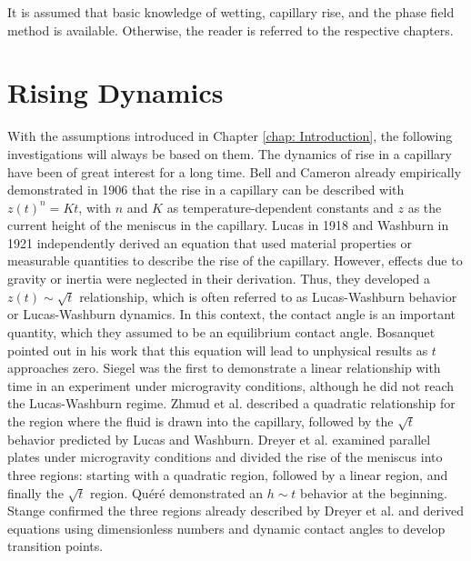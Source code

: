 It is assumed that basic knowledge of wetting, capillary rise, and the phase field method is available. Otherwise, the reader is referred to the respective chapters.

\section{Rising Dynamics}

With the assumptions introduced in Chapter \ref{chap: Introduction}, the following investigations will always be based on them. The dynamics of rise in a capillary have been of great interest for a long time. Bell and Cameron already empirically demonstrated in 1906 \cite{bell1906FlowLiquidsCapillary} that the rise in a capillary can be described with \(z(t)^n = Kt\), with \(n\) and \(K\) as temperature-dependent constants and \(z\) as the current height of the meniscus in the capillary. Lucas \cite{lucas1918UeberZeitgesetzKapillaren} in 1918 and Washburn \cite{washburn1921DynamicsCapillaryFlow} in 1921 independently derived an equation that used material properties or measurable quantities to describe the rise of the capillary. However, effects due to gravity or inertia were neglected in their derivation. Thus, they developed a \(z(t) \sim \sqrt{t}\) relationship, which is often referred to as Lucas-Washburn behavior or Lucas-Washburn dynamics. In this context, the contact angle is an important quantity, which they assumed to be an equilibrium contact angle.
Bosanquet \cite{bosanquet1923LVFlowLiquids} pointed out in his work that this equation will lead to unphysical results as \( t \) approaches zero.
Siegel \cite{siegel1961TransientCapillaryRise} was the first to demonstrate a linear relationship with time in an experiment under microgravity conditions, although he did not reach the Lucas-Washburn regime. Zhmud et al. \cite{zhmud2000DynamicsCapillaryRise} described a quadratic relationship for the region where the fluid is drawn into the capillary, followed by the \( \sqrt{t} \) behavior predicted by Lucas and Washburn.
Dreyer et al. \cite{dreyer1994CapillaryRiseLiquid} examined parallel plates under microgravity conditions and divided the rise of the meniscus into three regions: starting with a quadratic region, followed by a linear region, and finally the \( \sqrt{t} \) region.
Quéré \cite{quere1997InertialCapillarity} demonstrated an \( h \sim t \) behavior at the beginning. Stange \cite{stange2003CapillaryDrivenFlow} confirmed the three regions already described by Dreyer et al. \cite{dreyer1994CapillaryRiseLiquid} and derived equations using dimensionless numbers and dynamic contact angles to develop transition points.
